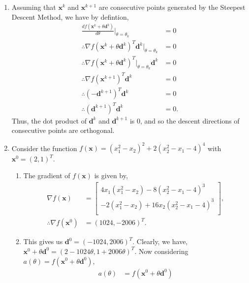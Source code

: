 \documentclass[a4paper,11pt]{article}
\newcommand{\ds}{\displaystyle}
\begin{document}
{{\begin{enumerate}[leftmargin=*]
\begin{enumerate}[label=\alph*)]
			\end{enumerate}
			\pagebreak
		\item Assuming that $\ds{\mathbf{x}^k}$ and $\ds{\mathbf{x}^{k+1}}$ are consecutive points generated by the Steepest Descent Method, we have by defintion,
			\begin{align*}
				\frac{df\left(\mathbf{x}^{k} + \theta \mathbf{d}^{k}\right)}{d\theta}\bigg|_{\theta=\theta_k} & = 0 \\
				\therefore \nabla f\left(\mathbf{x}^{k} + \theta \mathbf{d}^{k}\right)^T\mathbf{d}^k\Big|_{\theta=\theta_k} & = 0 \\
				\therefore \nabla f\left(\mathbf{x}^{k} + \theta \mathbf{d}^{k}\right)^T\Big|_{\theta=\theta_k}\mathbf{d}^k & = 0 \\
				\therefore \nabla f\left(\mathbf{x}^{k+1} \right)^T\mathbf{d}^k & = 0 \\
				\therefore \left(-\mathbf{d}^{k+1} \right)^T\mathbf{d}^k & = 0 \\
				\therefore \left(\mathbf{d}^{k+1} \right)^T\mathbf{d}^k & = 0.
			\end{align*}
			Thus, the dot product of $\ds{\mathbf{d}^k}$ and $\ds{\mathbf{d}^{k+1}}$ is 0, and so the descent directions of consecutive points are orthogonal.
		\item Consider the function $\ds{f(\mathbf{x}) = \left(x_1^2-x_2\right)^2 + 2\left(x_2^2-x_1-4\right)^4}$ with $\ds{\mathbf{x}^0 = (2,1)^T}$.
			\begin{enumerate}[label=\alph*)]
				\item The gradient of $\ds{f(\mathbf{x})}$ is given by,
					\begin{align*}
						\nabla f(\mathbf{x}) & = 
						\begin{bmatrix}
							4x_1\left(x_1^2-x_2\right) - 8\left(x_2^2-x_1-4\right)^3 \\
							-2\left(x_1^2-x_2\right) + 16x_2\left(x_2^2-x_1-4\right)^3\\
						\end{bmatrix}, \\
						\therefore \nabla f(\mathbf{x}^0) & = (1024,-2006)^T.
					\end{align*}
				\item This gives us $\ds{\mathbf{d}^0 = (-1024, 2006)^T}$. Clearly, we have, $\ds{\mathbf{x}^{0} + \theta \mathbf{d}^{0} = (2-1024\theta, 1+2006\theta)^T}$. Now considering $\ds{a(\theta) = f(\mathbf{x}^{0} + \theta \mathbf{d}^{0})}$, 
					\begin{align*}
						a(\theta) & = f(\mathbf{x}^{0} + \theta \mathbf{d}^{0}) \\

\end{align*}
\end{enumerate}
\end{enumerate}}}
\end{document}
